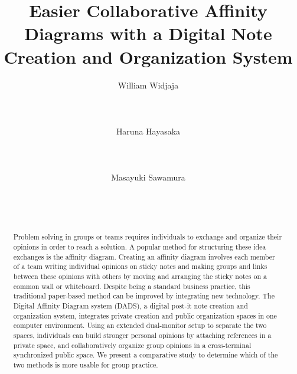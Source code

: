 \documentclass{sigchi}
\begin{document}
\title{Easier Collaborative Affinity Diagrams with a Digital Note Creation and Organization System}

\author{
  \alignauthor William Widjaja\\
    \\
    \\
    \\
  \alignauthor Haruna Hayasaka \\
    \\
    \\
    \\   
  \alignauthor Masayuki Sawamura \\
    \\
    \\
    \\
}

\maketitle

\begin{abstract}
Problem solving in groups or teams requires individuals to exchange and organize their opinions in order to reach a solution. A popular method for structuring these idea exchanges is the affinity diagram. Creating an affinity diagram involves each member of a team writing individual opinions on sticky notes and making groups and links between these opinions with others by moving and arranging the sticky notes on a common wall or whiteboard. Despite being a standard business practice, this traditional paper-based method can be improved by integrating new technology. The Digital Affinity Diagram system (DADS), a digital post-it note creation and organization system, integrates private creation and public organization spaces in one computer environment. Using an extended dual-monitor setup to separate the two spaces, individuals can build stronger personal opinions by attaching references in a private space, and collaboratively organize group opinions in a cross-terminal synchronized public space.  We present a comparative study to determine which of the two methods is more usable for group practice. 
\end{abstract}
\end{document}
